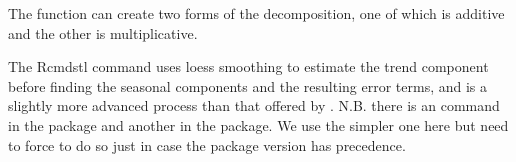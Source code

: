  
The  function can create two forms of the decomposition, one of which is additive and the other is multiplicative. 
\begin{knitrout}
\color{fgcolor}\begin{kframe}
\begin{alltt}
\hlstd{> } \hlkwb{=} 
\hlstd{> } \hlkwb{=} \hlstd{=}\hlstd{)}
\end{alltt}
\end{kframe}
\end{knitrout}
The Rcmd{stl} command uses loess smoothing to estimate the trend component before finding the seasonal components and the resulting error terms, and is a slightly more advanced process than that offered by . N.B. there is an  command in the  package and another in the  package. We use the simpler one here but need to force \R{} to do so just in case the  package version has precedence. 
 
